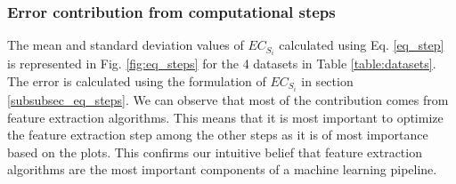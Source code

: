 \subsubsection{Error contribution from computational steps}
The mean and standard deviation values of $EC_{S_i}$ calculated using Eq. \ref{eq_step} is represented in Fig. \ref{fig:eq_steps} for the 4 datasets in Table \ref{table:datasets}. The error is calculated using the formulation of $EC_{S_i}$ in section \ref{subsubsec_eq_steps}. We can observe that most of the contribution comes from feature extraction algorithms. This means that it is most important to optimize the feature extraction step among the other steps as it is of most importance based on the plots. This confirms our intuitive belief that feature extraction algorithms are the most important components of a machine learning pipeline. 
